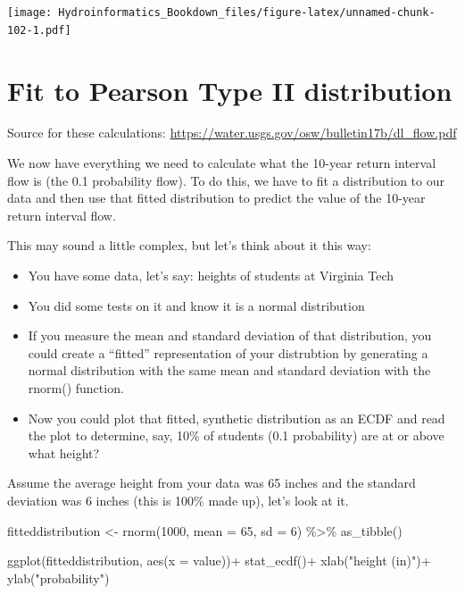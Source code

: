 \documentclass[
]{book}
\newenvironment{Shaded}{\begin{snugshade}}{\end{snugshade}}
\newcommand{\AttributeTok}[1]{\textcolor[rgb]{0.77,0.63,0.00}{#1}}
\newcommand{\DecValTok}[1]{\textcolor[rgb]{0.00,0.00,0.81}{#1}}
\newcommand{\FunctionTok}[1]{\textcolor[rgb]{0.00,0.00,0.00}{#1}}
\newcommand{\NormalTok}[1]{#1}
\newcommand{\OtherTok}[1]{\textcolor[rgb]{0.56,0.35,0.01}{#1}}
\newcommand{\SpecialCharTok}[1]{\textcolor[rgb]{0.00,0.00,0.00}{#1}}
\newcommand{\StringTok}[1]{\textcolor[rgb]{0.31,0.60,0.02}{#1}}
\providecommand{\tightlist}{%
  \setlength{\itemsep}{0pt}\setlength{\parskip}{0pt}}
\begin{document}
\texttt{[image: Hydroinformatics\_Bookdown\_files/figure-latex/unnamed-chunk-102-1.pdf]}

\hypertarget{fit-to-pearson-type-ii-distribution}{%
\section{Fit to Pearson Type II distribution}\label{fit-to-pearson-type-ii-distribution}}

Source for these calculations:
\url{https://water.usgs.gov/osw/bulletin17b/dl_flow.pdf}

We now have everything we need to calculate what the 10-year return interval flow is (the 0.1 probability flow). To do this, we have to fit a distribution to our data and then use that fitted distribution to predict the value of the 10-year return interval flow.

This may sound a little complex, but let's think about it this way:

\begin{itemize}
\tightlist
\item
  You have some data, let's say: heights of students at Virginia Tech
\item
  You did some tests on it and know it is a normal distribution
\item
  If you measure the mean and standard deviation of that distribution, you could create a ``fitted'' representation of your distrubtion by generating a normal distribution with the same mean and standard deviation with the rnorm() function.
\item
  Now you could plot that fitted, synthetic distribution as an ECDF and read the plot to determine, say, 10\% of students (0.1 probability) are at or above what height?
\end{itemize}

Assume the average height from your data was 65 inches and the standard deviation was 6 inches (this is 100\% made up), let's look at it.

\begin{Shaded}
\begin{Highlighting}[]
\NormalTok{fitteddistribution }\OtherTok{\textless{}{-}} \FunctionTok{rnorm}\NormalTok{(}\DecValTok{1000}\NormalTok{, }\AttributeTok{mean =} \DecValTok{65}\NormalTok{, }\AttributeTok{sd =} \DecValTok{6}\NormalTok{) }\SpecialCharTok{\%\textgreater{}\%}
  \FunctionTok{as\_tibble}\NormalTok{()}

\FunctionTok{ggplot}\NormalTok{(fitteddistribution, }\FunctionTok{aes}\NormalTok{(}\AttributeTok{x =}\NormalTok{ value))}\SpecialCharTok{+}
  \FunctionTok{stat\_ecdf}\NormalTok{()}\SpecialCharTok{+}
  \FunctionTok{xlab}\NormalTok{(}\StringTok{"height (in)"}\NormalTok{)}\SpecialCharTok{+}
  \FunctionTok{ylab}\NormalTok{(}\StringTok{"probability"}\NormalTok{)}
\end{Highlighting}
\end{Shaded}
\end{document}
